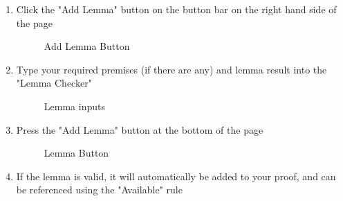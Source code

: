 \begin{enumerate}
	\item Click the "Add Lemma" button on the button bar on the right hand side of the page
	
	\begin{figure}[!ht]
		\centering
		\caption{Add Lemma Button}
	\end{figure}

	\item Type your required premises (if there are any) and lemma result into the "Lemma Checker"
	
	\begin{figure}[!ht]
		\centering
		\caption{Lemma inputs}
	\end{figure}

	\item Press the "Add Lemma" button at the bottom of the page
	
	\begin{figure}[!ht]
		\centering
		\caption{Lemma Button}
	\end{figure}

	\item If the lemma is valid, it will automatically be added to your proof, and can be referenced using the "Available" rule
	
\end{enumerate}

